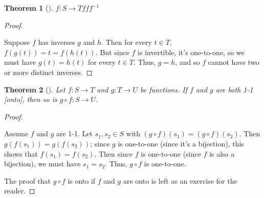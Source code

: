 \documentclass[10pt,]{book}
\theoremstyle{plain}
\newtheorem{theorem}{Theorem}[section]
\theoremstyle{definition}
\theoremstyle{definition}
\theoremstyle{definition}
\theoremstyle{definition}
\numberwithin{equation}{section}
\begin{document}
\begin{theorem}[{}]\label{theorem-2}
\(f:S\to T\)\(f\)\(f\)\(f^{-1}\)\label{notation-28}
\end{theorem}
\begin{proof}\hypertarget{proof-2}{}
Suppose \(f\) has inverses \(g\) and \(h\). Then for every \(t\in T,\) \(f(g(t))=t=f(h(t))\). But since \(f\) is invertible, it's one-to-one, so we must have \(g(t)=h(t)\) for every \(t\in T\). Thus, \(g=h\), and so \(f\) cannot have two or more distinct inverses.%
\end{proof}
\begin{theorem}[{}]\label{compbij}
Let \(f:S\to T\) and \(g:T\to U\) be functions. If \(f\) and \(g\) are both 1-1 [onto], then so is \(g\circ f: S\to U\).%
\end{theorem}
\begin{proof}\hypertarget{proof-3}{}
Assume \(f\) and \(g\) are 1-1. Let \(s_1, s_2\in S\) with \((g\circ f)(s_1)=(g\circ f)(s_2)\). Then \(g(f(s_1))=g(f(s_2))\); since \(g\) is one-to-one (since it's a bijection), this shows that \(f(s_1)=f(s_2)\). Then since \(f\) is one-to-one (since \(f\) is also a bijection), we must have \(s_1=s_2\). Thus, \(g\circ f\) is one-to-one.%
\par
The proof that \(g\circ f\) is onto if \(f\) and \(g\) are onto is left as an exercise for the reader.%
\end{proof}
\typeout{************************************************}
\typeout{************************************************}
\end{document}
